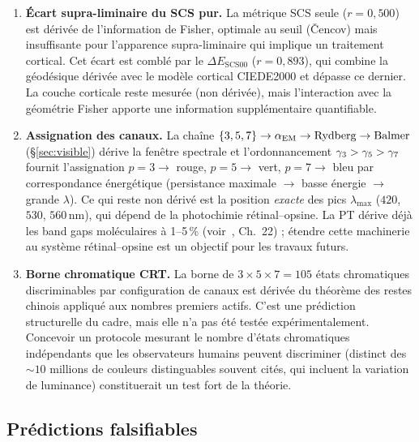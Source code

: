 \documentclass[12pt,a4paper]{article}
\begin{document}
\begin{enumerate}[nosep]
\item \textbf{\'Ecart supra-liminaire du SCS pur.} La m\'etrique SCS
  seule ($r = 0{,}500$) est d\'eriv\'ee de l'information de Fisher,
  optimale au seuil (\v{C}encov) mais insuffisante pour l'apparence
  supra-liminaire qui implique un traitement cortical. Cet \'ecart est
  combl\'e par le $\Delta E_{\mathrm{SCS00}}$ ($r = 0{,}893$), qui
  combine la g\'eod\'esique d\'eriv\'ee avec le mod\`ele cortical
  CIEDE2000 et d\'epasse ce dernier. La couche corticale reste
  mesur\'ee (non d\'eriv\'ee), mais l'interaction avec la g\'eom\'etrie
  Fisher apporte une information suppl\'ementaire quantifiable.

\item \textbf{Assignation des canaux.} La cha\^ine
  $\{3,5,7\} \to \alpha_{\mathrm{EM}} \to \mathrm{Rydberg} \to \mathrm{Balmer}$
  (\S\ref{sec:visible}) d\'erive la fen\^etre spectrale et
  l'ordonnancement $\gamma_{3} > \gamma_{5} > \gamma_{7}$ fournit
  l'assignation $p=3 \to$ rouge, $p=5 \to$ vert, $p=7 \to$ bleu
  par correspondance \'energ\'etique (persistance maximale $\to$ basse
  \'energie $\to$ grande $\lambda$). Ce qui reste non d\'eriv\'e est
  la position \emph{exacte} des pics $\lambda_{\max}$ ($420$, $530$,
  $560\,\mathrm{nm}$), qui d\'epend de la photochimie r\'etinal--opsine.
  La PT d\'erive d\'ej\`a les band gaps mol\'eculaires \`a 1--5\,\%
  (voir~\cite{senez2026math}, Ch.~22) ; \'etendre cette machinerie au
  syst\`eme r\'etinal--opsine est un objectif pour les travaux futurs.

\item \textbf{Borne chromatique CRT.} La borne de
  $3 \times 5 \times 7 = 105$ \'etats chromatiques discriminables par
  configuration de canaux est d\'eriv\'ee du th\'eor\`eme des restes
  chinois appliqu\'e aux nombres premiers actifs. C'est une pr\'ediction
  structurelle du cadre, mais elle n'a pas \'et\'e test\'ee
  exp\'erimentalement. Concevoir un protocole mesurant le nombre
  d'\'etats chromatiques ind\'ependants que les observateurs humains
  peuvent discriminer (distinct des $\sim\!10$ millions de couleurs
  distinguables souvent cit\'es, qui incluent la variation de luminance)
  constituerait un test fort de la th\'eorie.
\end{enumerate}

\subsection{Pr\'edictions falsifiables}
\end{document}
